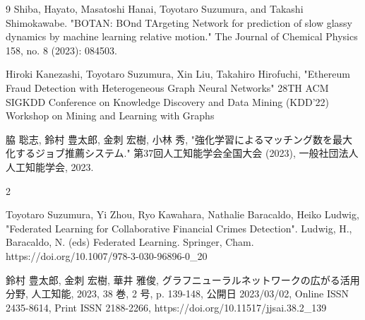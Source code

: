 \begin{査読付}{9}
Shiba, Hayato, Masatoshi Hanai, Toyotaro Suzumura, and Takashi Shimokawabe. "BOTAN: BOnd TArgeting Network for prediction of slow glassy dynamics by machine learning relative motion." The Journal of Chemical Physics 158, no. 8 (2023): 084503.

Hiroki Kanezashi, Toyotaro Suzumura, Xin Liu, Takahiro Hirofuchi,
"Ethereum Fraud Detection with Heterogeneous Graph Neural Networks"
28TH ACM SIGKDD Conference on Knowledge Discovery and Data Mining (KDD'22) Workshop on Mining and Learning with Graphs

脇 聡志, 鈴村 豊太郎, 金刺 宏樹, 小林 秀, "強化学習によるマッチング数を最大化するジョブ推薦システム." 第37回人工知能学会全国大会 (2023),  一般社団法人 人工知能学会, 2023.



\end{査読付}

\begin{著書}{2}

Toyotaro Suzumura, Yi Zhou, Ryo Kawahara, Nathalie Baracaldo, Heiko Ludwig,
"Federated Learning for Collaborative Financial Crimes Detection".
Ludwig, H., Baracaldo, N. (eds) Federated Learning. Springer, Cham. https://doi.org/10.1007/978-3-030-96896-0\_20

鈴村 豊太郎, 金刺 宏樹, 華井 雅俊, グラフニューラルネットワークの広がる活用分野, 人工知能, 2023, 38 巻, 2 号, p. 139-148, 公開日 2023/03/02, Online ISSN 2435-8614, Print ISSN 2188-2266, https://doi.org/10.11517/jjsai.38.2\_139

\end{著書}


